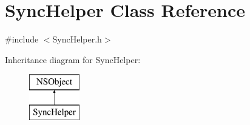 \hypertarget{interface_sync_helper}{
\section{\-Sync\-Helper \-Class \-Reference}
\label{interface_sync_helper}
}


{\ttfamily \#include $<$\-Sync\-Helper.\-h$>$}

\-Inheritance diagram for \-Sync\-Helper\-:\begin{figure}[H]
\begin{center}
\leavevmode
\includegraphics[height=2.000000cm]{interface_sync_helper}
\end{center}
\end{figure}
